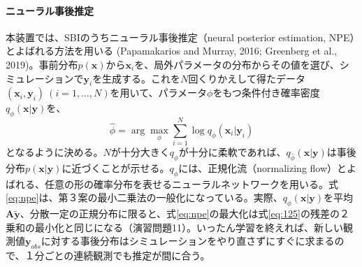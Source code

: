 \documentclass{ltjsarticle}
\begin{document}
\paragraph{ニューラル事後推定}
本装置では、SBIのうちニューラル事後推定（neural posterior estimation, NPE）とよばれる方法を用いる (Papamakarios and Murray, 2016; Greenberg et al., 2019)。事前分布$p(\bm{x})$から$\bm{x}_{i}$を、局外パラメータの分布からその値を選び、シミュレーションで$\bm{y}_{i}$を生成する。これを$N$回くりかえして得たデータ$(\bm{x}_{i}, \bm{y}_{i})\ (i=1,\dots,N)$を用いて、パラメータ$\phi$をもつ条件付き確率密度$q_{\phi}(\bm{x}|\bm{y})$を、
\begin{equation}\label{eq:npe}
\hat{\phi} = \arg\max_{\phi}\sum_{i=1}^{N}\log q_{\phi}(\bm{x}_{i}|\bm{y}_{i})
\end{equation}
となるように決める。$N$が十分大きく$q_{\phi}$が十分に柔軟であれば、$q_{\hat{\phi}}(\bm{x}|\bm{y})$は事後分布$p(\bm{x}|\bm{y})$に近づくことが示せる。$q_{\phi}$には、正規化流（normalizing flow）とよばれる、任意の形の確率分布を表せるニューラルネットワークを用いる。式\eqref{eq:npe}は、第３案の最小二乗法の一般化になっている。実際、$q_{\phi}(\bm{x}|\bm{y})$を平均$\bm{A}\tilde{\bm{y}}$、分散一定の正規分布に限ると、式\eqref{eq:npe}の最大化は式\eqref{eq:125}の残差の２乗和の最小化と同じになる（演習問題11）。いったん学習を終えれば、新しい観測値$\bm{y}_{obs}$に対する事後分布はシミュレーションをやり直さずにすぐに求まるので、１分ごとの連続観測でも推定が間に合う。
\end{document}
